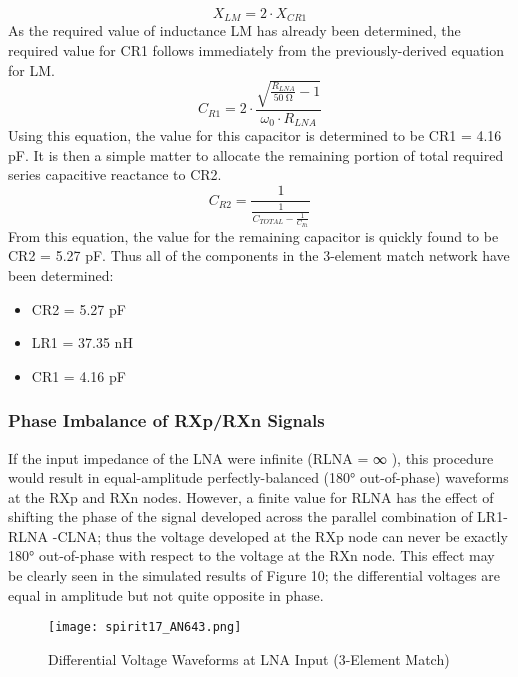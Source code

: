         \begin{equation}\label{EXP001:eq_spirit16}
         X_{LM} = 2\cdot X_{CR1}
        \end{equation}
        As the required value of inductance LM has already been determined, the required value for 
        CR1 follows immediately from the previously-derived equation for LM.
        \begin{equation}\label{EXP001:eq_spirit17}
          C_{R1} = 2\cdot\frac{\sqrt{\frac{R_{LNA}}{\SI{50}{\ohm}}-1}}{\omega_0\cdot R_{LNA}}
        \end{equation}
        Using this equation, the value for this capacitor is determined to be CR1 = 4.16 pF. It is 
        then a simple matter to allocate the remaining portion of total required series capacitive 
        reactance to CR2.
        \begin{equation}\label{EXP001:eq_spirit18}
          C_{R2} = \frac{1}{\frac{1}{C_{TOTAL}-\frac{1}{C_{R1}}}}
        \end{equation}
        From this equation, the value for the remaining capacitor is quickly found to be CR2 = 5.27 
        pF. Thus all of the components in the 3-element match network have been determined:
        \begin{itemize}\addtolength{\itemsep}{-0.5\baselineskip}
          \item CR2 = 5.27 pF
          \item LR1 = 37.35 nH
          \item CR1 = 4.16 pF
        \end{itemize}
        
      \subsubsection{Phase Imbalance of RXp/RXn Signals}
        If the input impedance of the LNA were infinite (RLNA = ∞ ), this procedure would result in 
        equal-amplitude perfectly-balanced (180° out-of-phase) waveforms at the RXp and RXn nodes. 
        However, a finite value for RLNA has the effect of shifting the phase of the signal 
        developed across the parallel combination of LR1- RLNA -CLNA; thus the voltage developed at 
        the RXp node can never be exactly 180° out-of-phase with respect to the voltage at the RXn 
        node. This effect may be clearly seen in the simulated results of Figure 10; the 
        differential voltages are equal in amplitude but not quite opposite in phase.
        \begin{figure}[ht!] %
          \centering
          \texttt{[image: spirit17\_AN643.png]}
          \caption{Differential Voltage Waveforms at LNA Input (3-Element Match) 
                  \cite[s.~11]{AN643SiliconLabs}}
          \label{EXP001:fig_spirit17}
        \end{figure}
        
